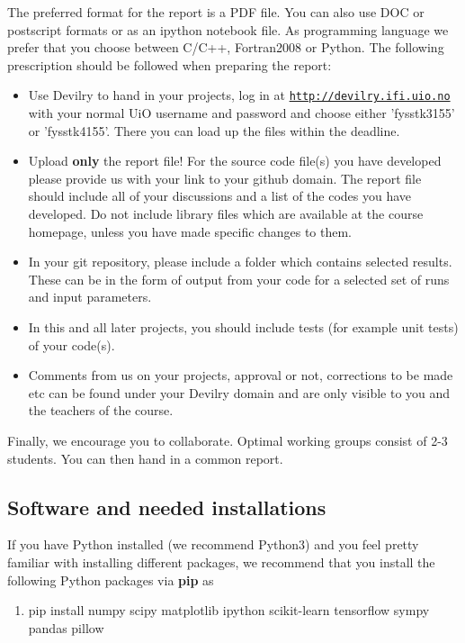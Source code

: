 \documentclass[%
oneside,                 %
final,                   %
10pt]{article}
\begin{document}
The preferred format for the report is a PDF file. You can also use DOC or postscript formats or as an ipython notebook file.  As programming language we prefer that you choose between C/C++, Fortran2008 or Python. The following prescription should be followed when preparing the report:

\begin{itemize}
  \item Use Devilry to hand in your projects, log in  at  \href{{http://devilry.ifi.uio.no}}{\nolinkurl{http://devilry.ifi.uio.no}} with your normal UiO username and password and choose either 'fysstk3155' or 'fysstk4155'. There you can load up the files within the deadline.

  \item Upload \textbf{only} the report file!  For the source code file(s) you have developed please provide us with your link to your github domain.  The report file should include all of your discussions and a list of the codes you have developed.  Do not include library files which are available at the course homepage, unless you have made specific changes to them.

  \item In your git repository, please include a folder which contains selected results. These can be in the form of output from your code for a selected set of runs and input parameters.

  \item In this and all later projects, you should include tests (for example unit tests) of your code(s).

  \item Comments  from us on your projects, approval or not, corrections to be made  etc can be found under your Devilry domain and are only visible to you and the teachers of the course.
\end{itemize}

\noindent
Finally, 
we encourage you to collaborate. Optimal working groups consist of 
2-3 students. You can then hand in a common report. 



\subsection{Software and needed installations}

If you have Python installed (we recommend Python3) and you feel pretty familiar with installing different packages, 
we recommend that you install the following Python packages via \textbf{pip} as
\begin{enumerate}
\item pip install numpy scipy matplotlib ipython scikit-learn tensorflow sympy pandas pillow
\end{enumerate}
\end{document}
